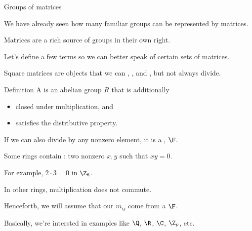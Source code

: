 \documentclass[8pt, handout]{beamer}
\newcommand{\Pause}{}
\begin{document}
\begin{frame}{Groups of matrices} %

  We have already seen how many familiar groups can be represented by
  matrices. \medskip\Pause

  Matrices are a rich source of groups in their own right. \medskip\Pause

  Let's define a few terms so we can better speak of certain sets of
  matrices. \medskip\Pause

  Square matrices are objects that we can ,
  , and , but not always
  divide. \smallskip\Pause
    
  \begin{block}{Definition}
    A  is an abelian group $R$ that is additionally
    \begin{itemize}
    \item closed under multiplication, and
    \item  satisfies the distributive property.
    \end{itemize}
    If we can also divide by any nonzero element, it is a
    , $\F$.
  \end{block}

  \smallskip\Pause

  Some rings contain : two nonzero $x,y$ such
  that $xy=0$. \medskip\Pause

  For example, $2\cdot 3=0$ in $\Z_6$. \medskip\Pause

  In other rings, multiplication does not commute. \medskip\Pause

  Henceforth, we will assume that our 
   $m_{ij}$ come from a  $\F$.
  
  \medskip\Pause

  Basically, we're intersted in examples like $\Q$, $\R$, $\C$,
  $\Z_p$, etc. 
  
\end{frame}

\end{document}
